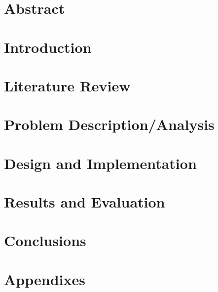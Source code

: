 \documentclass[a4paper, 11pt]{report}
\begin{document}

\chapter*{Abstract}

\tableofcontents
\chapter{Introduction} %

\chapter{Literature Review} %

\chapter{Problem Description/Analysis} %

\chapter{Design and Implementation}
\chapter{Results and Evaluation}
\chapter{Conclusions}
\appendix
{}


\chapter{Appendixes}

\end{document}
